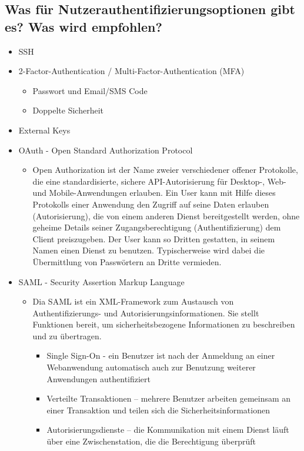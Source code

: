 \subsection*{Was für Nutzerauthentifizierungsoptionen gibt es? Was wird empfohlen?}
\begin{itemize}
    \item SSH
    \item 2-Factor-Authentication / Multi-Factor-Authentication (MFA)
    \begin{itemize}
        \item Passwort und Email/SMS Code
        \item Doppelte Sicherheit
    \end{itemize}
    \item External Keys
    \item OAuth - Open Standard Authorization Protocol
    \begin{itemize}
        \item Open Authorization ist der Name zweier verschiedener offener Protokolle, die eine standardisierte, sichere API-Autorisierung für Desktop-, Web- und Mobile-Anwendungen erlauben. Ein User kann mit Hilfe dieses Protokolls einer Anwendung den Zugriff auf seine Daten erlauben (Autorisierung), die von einem anderen Dienst bereitgestellt werden, ohne geheime Details seiner Zugangsberechtigung (Authentifizierung) dem Client preiszugeben. Der User kann so Dritten gestatten, in seinem Namen einen Dienst zu benutzen. Typischerweise wird dabei die Übermittlung von Passwörtern an Dritte vermieden.\cite{wiki}
    \end{itemize}
    \item SAML - Security Assertion Markup Language
    \begin{itemize}
        \item Dia SAML ist ein XML-Framework zum Austausch von Authentifizierungs- und Autorisierungsinformationen. Sie stellt Funktionen bereit, um sicherheitsbezogene Informationen zu beschreiben und zu übertragen.
        \begin{itemize}
            \item Single Sign-On - ein Benutzer ist nach der Anmeldung an einer Webanwendung automatisch auch zur Benutzung weiterer Anwendungen authentifiziert
            \item Verteilte Transaktionen – mehrere Benutzer arbeiten gemeinsam an einer Transaktion und teilen sich die Sicherheitsinformationen
            \item Autorisierungsdienste – die Kommunikation mit einem Dienst läuft über eine Zwischenstation, die die Berechtigung überprüft
        \end{itemize}
    \end{itemize}
\end{itemize}

